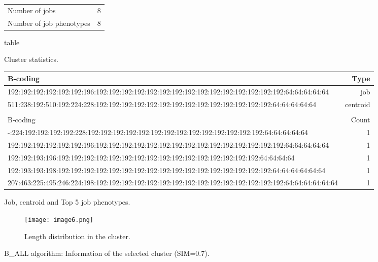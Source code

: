 \documentclass{jhps}
\begin{document}
\begin{figure}
	\begin{subtable}{\textwidth}
		\centering
		\begin{tabular}{ll}
			Number of jobs & 8 \\
			Number of job phenotypes & 8 \\
		\end{tabular}
		\caption{table}{Cluster statistics.}
		\label{cluster:use_case:bin_all:stats}
	\end{subtable}
	\medskip
	\begin{subtable}{\textwidth}
		\centering
		\begin{tiny}
			\begin{tabular}{l|r}
				\rowcolor{tblhead}
				B-coding                                                                                             &  Type     \\
				\hline
				192:192:192:192:192:192:196:192:192:192:192:192:192:192:192:192:192:192:192:192:192:192:64:64:64:64:64    &  job      \\
				511:238:192:510:192:224:228:192:192:192:192:192:192:192:192:192:192:192:192:192:192:64:64:64:64:64        &  centroid \\
				\multicolumn{2}{l}{}                                                                                      \\
				\rowcolor{tblhead}
				B-coding                                                                                             &  Count    \\
				\hline
				-:224:192:192:192:192:228:192:192:192:192:192:192:192:192:192:192:192:192:192:192:64:64:64:64:64          &  1        \\
				192:192:192:192:192:192:196:192:192:192:192:192:192:192:192:192:192:192:192:192:192:192:64:64:64:64:64    &  1        \\
				192:192:193:196:192:192:192:192:192:192:192:192:192:192:192:192:192:192:192:192:64:64:64:64               &  1        \\
				192:193:193:198:192:192:192:192:192:192:192:192:192:192:192:192:192:192:192:192:192:64:64:64:64:64:64     &  1        \\
				207:463:225:495:246:224:198:192:192:192:192:192:192:192:192:192:192:192:192:192:192:192:64:64:64:64:64:64 &  1        \\
			\end{tabular}
		\end{tiny}
		\caption{Job, centroid and Top 5 job phenotypes.}
		\label{cluster:use_case:bin_all:top_jobs}
	\end{subtable}
	\medskip
	\begin{subfigure}{\textwidth}
		\centering
		\texttt{[image: image6.png]}
		\caption{Length distribution in the cluster.}
		\label{cluster:use_case:bin_all:length}
	\end{subfigure}
	\caption{B\_ALL algorithm: Information of the selected cluster (SIM=0.7).}
	\label{cluster:use_case:bin_all}
\end{figure}
\end{document}
